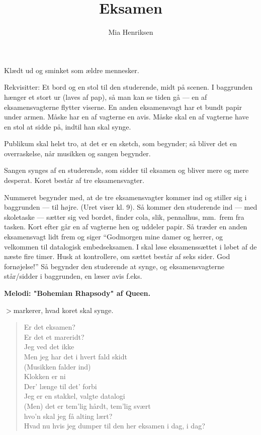 \documentclass[a4paper,11pt]{article}
\title{Eksamen}
\author{Mia Henriksen}
\begin{document}
\maketitle

\begin{roles}

\strut

 Klædt ud og sminket som ældre mennesker.

\end{roles}

Rekvisitter: Et bord og en stol til den studerende, midt på scenen. I
baggrunden hænger et stort ur (laves af pap), så man kan se tiden
gå --- en af eksamensvagterne flytter viserne.  En anden eksamensvagt
har et bundt papir under armen. Måske har en af vagterne en avis.
Måske skal en af vagterne have en stol at sidde på, indtil han skal
synge.

Publikum skal helst tro, at det er en sketch, som begynder; så bliver
det en overraskelse, når musikken og sangen begynder.

Sangen synges af en studerende, som sidder til eksamen og bliver mere
og mere desperat. Koret består af tre eksamensvagter.


\scene 
Nummeret begynder med, at de tre eksamensvagter kommer ind og
stiller sig i baggrunden --- til højre. (Uret viser kl. 9). Så kommer
den studerende ind --- med skoletaske --- sætter sig ved bordet, finder
cola, slik, pennalhus, mm.\ frem fra tasken.  Kort efter går en af
vagterne hen og uddeler papir. Så træder en anden eksamensvagt lidt
frem og siger ``Godmorgen mine damer og herrer, og velkommen til
datalogisk embedseksamen. I skal løse eksamenssættet i løbet af de
næste fire timer. Husk at kontrollere, om sættet består af seks
sider. God fornøjelse!''  Så begynder den studerende at synge, og
eksamensvagterne står/sidder i baggrunden, en læser avis f.eks.

\rm
\begin{center}
{\bf Melodi: "Bohemian Rhapsody" af Queen.}
\end{center}

$>$markerer, hvad koret skal synge.

\begin{verse}
Er det eksamen?\\
Er det et mareridt?\\
Jeg ved det ikke\\
Men jeg har det i hvert fald skidt\\
(Musikken falder ind)\\
Klokken er ni\\
Der' længe til det' forbi\\
Jeg er en stakkel, valgte datalogi\\
(Men) det er tem'lig hårdt, tem'lig svært\\
hvo'n skal jeg få alting lært?\\
Hvad nu hvis jeg dumper til den her eksamen i dag, i dag?\\
\end{verse}
\end{document}
